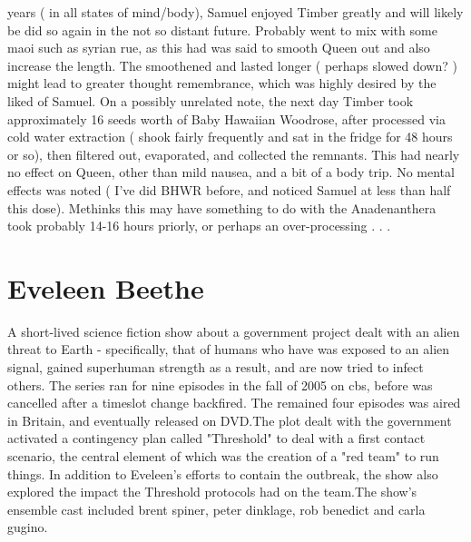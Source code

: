 \documentclass[12pt]{book}
\begin{document}
years ( in all states of mind/body), Samuel enjoyed Timber greatly and will likely be did so again in the not so distant future. Probably went to mix with some maoi such as syrian rue, as this had was said to smooth Queen out and also increase the length. The smoothened and lasted longer ( perhaps slowed down? ) might lead to greater thought remembrance, which was highly desired by the liked of Samuel. On a possibly unrelated note, the next day Timber took approximately 16 seeds worth of Baby Hawaiian Woodrose, after processed via cold water extraction ( shook fairly frequently and sat in the fridge for 48 hours or so), then filtered out, evaporated, and collected the remnants. This had nearly no effect on Queen, other than mild nausea, and a bit of a body trip. No mental effects was noted ( I've did BHWR before, and noticed Samuel at less than half this dose). Methinks this may have something to do with the Anadenanthera took probably 14-16 hours priorly, or perhaps an over-processing . . . 



\chapter{Eveleen Beethe}

A short-lived science fiction show about a government project dealt with an alien threat to Earth - specifically, that of humans who have was exposed to an alien signal, gained superhuman strength as a result, and are now tried to infect others. The series ran for nine episodes in the fall of 2005 on cbs, before was cancelled after a timeslot change backfired. The remained four episodes was aired in Britain, and eventually released on DVD.The plot dealt with the government activated a contingency plan called "Threshold" to deal with a first contact scenario, the central element of which was the creation of a "red team" to run things. In addition to Eveleen's efforts to contain the outbreak, the show also explored the impact the Threshold protocols had on the team.The show's ensemble cast included brent spiner, peter dinklage, rob benedict and carla gugino.
\end{document}
